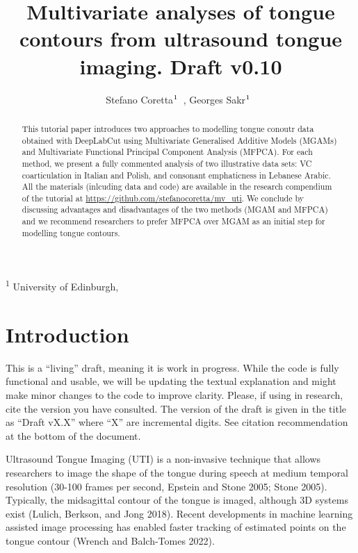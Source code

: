 \documentclass[
]{interact}
\title{Multivariate analyses of tongue contours from ultrasound tongue
imaging. Draft v0.10}
\author{Stefano
Coretta$\textsuperscript{1}$~\orcidlink{0000-0001-9627-5532}, Georges
Sakr$\textsuperscript{1}$~\orcidlink{0000-0003-3813-2669}}
\begin{document}
\captionsetup{labelsep=space}
\maketitle
\textsuperscript{1}  University of Edinburgh,  
\begin{abstract}
This tutorial paper introduces two approaches to modelling tongue
conoutr data obtained with DeepLabCut using Multivariate Generalised
Additive Models (MGAMs) and Multivariate Functional Principal Component
Analysis (MFPCA). For each method, we present a fully commented analysis
of two illustrative data sets: VC coarticulation in Italian and Polish,
and consonant emphaticness in Lebanese Arabic. All the materials
(inlcuding data and code) are available in the research compendium of
the tutorial at \url{https://github.com/stefanocoretta/mv_uti}. We
conclude by discussing advantages and disadvantages of the two methods
(MGAM and MFPCA) and we recommend researchers to prefer MFPCA over MGAM
as an initial step for modelling tongue contours.
\end{abstract}


\section{Introduction}\label{introduction}

\begin{tcolorbox}[enhanced jigsaw, colframe=quarto-callout-warning-color-frame, coltitle=black, bottomrule=.15mm, bottomtitle=1mm, opacitybacktitle=0.6, breakable, leftrule=.75mm, left=2mm, toprule=.15mm, colbacktitle=quarto-callout-warning-color!10!white, arc=.35mm, titlerule=0mm, toptitle=1mm, title=\textcolor{quarto-callout-warning-color}{\faExclamationTriangle}\hspace{0.5em}{Warning}, rightrule=.15mm, opacityback=0, colback=white]

This is a ``living'' draft, meaning it is work in progress. While the
code is fully functional and usable, we will be updating the textual
explanation and might make minor changes to the code to improve clarity.
Please, if using in research, cite the version you have consulted. The
version of the draft is given in the title as ``Draft vX.X'' where ``X''
are incremental digits. See citation recommendation at the bottom of the
document.

\end{tcolorbox}

Ultrasound Tongue Imaging (UTI) is a non-invasive technique that allows
researchers to image the shape of the tongue during speech at medium
temporal resolution (30-100 frames per second, Epstein and Stone 2005;
Stone 2005). Typically, the midsagittal contour of the tongue is imaged,
although 3D systems exist (Lulich, Berkson, and Jong 2018). Recent
developments in machine learning assisted image processing has enabled
faster tracking of estimated points on the tongue contour (Wrench and
Balch-Tomes 2022).
\end{document}
